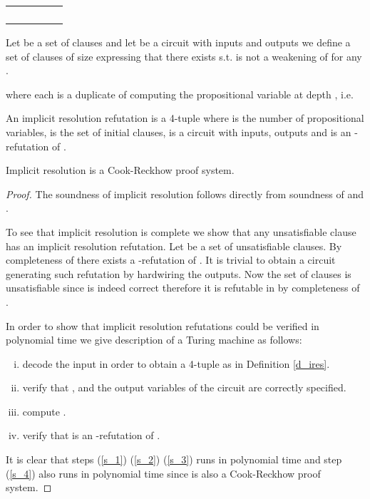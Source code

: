\documentclass{LMCS}
\theoremstyle{plain}\newtheorem{satz}[thm]{Satz}
\begin{document}
\begin{tabular}{c c c c c c}
 &   & \multicolumn{2}{c}{} &  & \\
 & \multicolumn{2}{c}{} &  &  & \\
 & \multicolumn{4}{c}{} & \\
 &  & \multicolumn{2}{c}{} &  & 
\end{tabular}

\noindent Let  be a set of clauses and let  be a circuit with inputs  and outputs  we define a set of clauses  of size  expressing that there exists  s.t.  is not a weakening of  for any .

where each  is a duplicate of  computing the propositional variable at depth , i.e.


\begin{defi}
\label{d_ires}
An implicit resolution refutation is a 4-tuple  where  is the number of propositional variables,  is the set of initial clauses,  is a circuit with  inputs,  outputs and  is an -refutation of .
\end{defi}

\begin{lem}
Implicit resolution is a Cook-Reckhow proof system.
\begin{proof}
The soundness of implicit resolution follows directly from soundness of  and .

To see that implicit resolution is complete we show that any unsatisfiable clause has an implicit resolution refutation. Let  be a set of unsatisfiable clauses. By completeness of  there exists a -refutation of . It is trivial to obtain a circuit  generating such refutation by hardwiring the outputs. Now the set of clauses  is unsatisfiable since  is indeed correct therefore it is refutable in  by completeness of .

In order to show that implicit resolution refutations could be verified in polynomial time we give description of a Turing machine as follows:
\begin{enumerate}[(i)]
\item\label{s_1}
decode the input in order to obtain a 4-tuple  as in Definition \ref{d_ires}.
\item\label{s_2}
verify that ,  and the output variables of the circuit  are correctly specified.
\item\label{s_3}
compute .
\item\label{s_4}
verify that  is an -refutation of .
\end{enumerate}

It is clear that steps (\ref{s_1}) (\ref{s_2}) (\ref{s_3}) runs in polynomial time and step (\ref{s_4}) also runs in polynomial time since  is also a Cook-Reckhow proof system.
\end{proof}
\end{lem}
\end{document}
